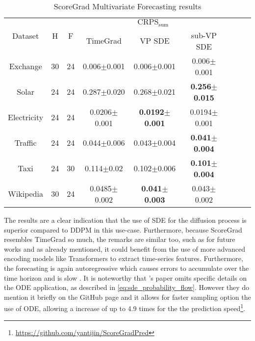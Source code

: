 \begin{table}[ht]
    \centering
    \begin{tabular}{ccccccccc}
        \toprule
        \multirow{2}{*}{Dataset} & \multirow{2}{*}{H} & \multirow{2}{*}{F} & \multicolumn{3}{c}{$\text{CRPS}_{\text{sum}}$} \\
        \cmidrule(lr){4-6} 
         & & & TimeGrad & VP SDE & sub-VP SDE \\
        \midrule
        Exchange & 30 & 24 & 0.006$\pm$0.001 & 0.006$\pm$0.001 & 0.006$\pm$0.001  \\
        \midrule
        Solar & 24 & 24 & 0.287$\pm$0.020 & 0.268$\pm$0.021 & \textbf{0.256$\pm$0.015} \\
        \midrule
        Electricity & 24 & 24 & 0.0206$\pm$0.001 & \textbf{0.0192$\pm$0.001} & 0.0194$\pm$0.001 \\
        \midrule
        Traffic & 24 & 24 & 0.044$\pm$0.006 & 0.043$\pm$0.004 & \textbf{0.041$\pm$0.004} \\
        \midrule
        Taxi & 24 & 30 & 0.114$\pm$0.02 & 0.102$\pm$0.006 & \textbf{0.101$\pm$0.004} \\
        \midrule
        Wikipedia & 30 & 24 & 0.0485$\pm$0.002 & \textbf{0.041$\pm$0.003} & 0.043$\pm$0.002 \\
        \bottomrule
    \end{tabular}
    \caption{ScoreGrad Multivariate Forecasting results \cite{yan_scoregrad_2021}}
    \label{tab:scoregrad-results}
\end{table}
The results are a clear indication that the use of SDE for the diffusion process is superior compared to DDPM in this use-case.
Furthermore, because ScoreGrad resembles TimeGrad so much, the remarks are similar too, such as for future works and as \textcite{yan_scoregrad_2021} already mentioned, it could benefit from the use of more advanced encoding models like Transformers \cite{vaswani_attention_2017} to extract time-series features. Furthermore, the forecasting is again autoregressive which causes errors to accumulate over the time horizon and is slow \cite{shen_non-autoregressive_2023}. It is noteworthy that \textcite{yan_scoregrad_2021}'s paper omits specific details on the ODE application, as described in \autoref{eq:sde_probability_flow}. However they do mention it briefly on the GitHub page and it allows for faster sampling option the use of ODE, allowing a increase of up to 4.9 times for the the prediction speed\footnote{\url{https://github.com/yantijin/ScoreGradPred}}.